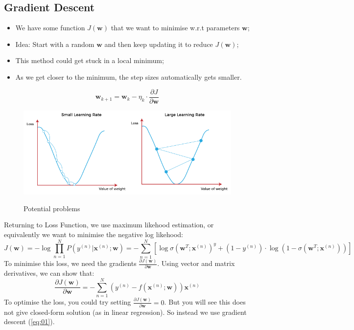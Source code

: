 \documentclass[a4paper, 11pt]{article}
\begin{document}
\subsection{Gradient Descent}
\begin{itemize}
        \item We have some function $J(\mathbf{w})$ that we want to minimise w.r.t parameters $\mathbf{w}$;
        \item Idea: Start with a random $\mathbf{w}$ and then keep updating it to reduce $J(\mathbf{w})$;
        \item This method could get stuck in a local minimum;
        \item As we get closer to the minimum, the step sizes automatically gets smaller.
\end{itemize}
\begin{equation}
        \mathbf{w}_{k + 1} = \mathbf{w}_{k} - \eta_{k}\cdot\frac{\partial J}{\partial\mathbf{w}}
        \label{eq:01}
\end{equation}
\begin{figure}[H]
        \centering
        \includegraphics[scale=0.6]{GD_problems.png}
        \label{fig: GD problems}
        \caption{Potential problems}
\end{figure}
\newpage
Returning to Loss Function, we use maximum likehood estimation, or equivalently we want to minimise the negative log likehood:
\begin{equation*}
        J(\mathbf{w}) = -\log{\prod\limits_{n = 1}^{N}P(y^{(n)}|\mathbf{x}^{(n)};\mathbf{w})} = -\sum\limits_{n = 1}^{N} [\log{\sigma(\mathbf{w}^{T};\mathbf{x}^{(n)})^{y}} + (1 - y^{(n)})\cdot\log(1 - \sigma(\mathbf{w}^{T};\mathbf{x}^{(n)}))]
\end{equation*}
To minimise this loss, we need the gradients $\frac{\partial J(\mathbf{w})}{\partial\mathbf{w}}$. Using vector and matrix derivatives, we can show that:
\begin{equation*}
        \frac{\partial J(\mathbf{w})}{\partial\mathbf{w}} = - \sum\limits_{n = 1}^{N}(y^{(n)} - f(\mathbf{x}^{(n)};\mathbf{w}))\mathbf{x}^{(n)}
\end{equation*}
To optimise the loss, you could try setting $\frac{\partial J(\mathbf{w})}{\partial\mathbf{w}} = 0$. But you will see this does not give closed-form solution (as in linear regression). So instead we use gradient descent (\ref{eq:01}).
\end{document}
